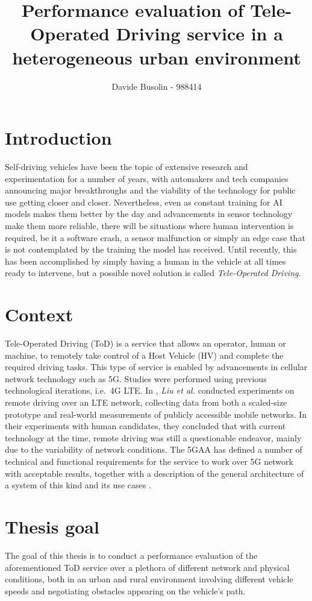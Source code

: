 \documentclass[12pt]{article}
\title{\vspace{-1.5cm}\Huge Performance evaluation of Tele-Operated Driving service in a heterogeneous urban environment}
\author{\Large Davide Busolin - 988414}
\date{}
\begin{document}
\maketitle

\section{Introduction}
Self-driving vehicles have been the topic of extensive research and experimentation for a number of years, with automakers and tech companies announcing major breakthroughs and the viability of the technology for public use getting closer and closer. Nevertheless, even as constant training for AI models makes them better by the day and advancements in sensor technology make them more reliable, there will be situations where human intervention is required, be it a software crash, a sensor malfunction or simply an edge case that is not contemplated by the training the model has received. Until recently, this has been accomplished by simply having a human in the vehicle at all times ready to intervene, but a possible novel solution is called \textit{Tele-Operated Driving}.

\section{Context}
Tele-Operated Driving (ToD) is a service that allows an operator, human or machine, to remotely take control of a Host Vehicle (HV) and complete the required driving tasks. This type of service is enabled by advancements in cellular network technology such as 5G.
Studies were performed using previous technological iterations, i.e.\ 4G LTE. In \cite{remote_driving_lte_network}, \textit{Liu et al.} conducted experiments on remote driving over an LTE network, collecting data from both a scaled-size prototype and real-world measurements of publicly accessible mobile networks. In their experiments with human candidates, they concluded that with current technology at the time, remote driving was still a questionable endeavor, mainly due to the variability of network conditions.
The 5GAA has defined a number of technical and functional requirements for the service to work over 5G network with acceptable results, together with a description of the general architecture of a system of this kind and its use cases \cite{5gaa_tod_system_requirements_architecture} \cite{5gaa_tod_use_cases_and_requirements}.

\section{Thesis goal}
The goal of this thesis is to conduct a performance evaluation of the aforementioned ToD service over a plethora of different network and physical conditions, both in an urban and rural environment involving different vehicle speeds and negotiating obstacles appearing on the vehicle's path.
\end{document}
